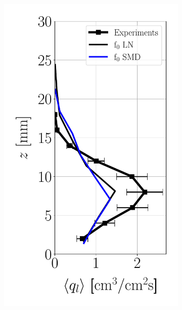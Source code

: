 \begin{figure}[h!]
\flushleft
\begin{subfigure}[b]{0.2\textwidth}
	\flushleft
   \includegraphics[scale=0.35]{./part2_developments/figures_ch6_lagrangian_JICF/params_f0/profiles/flux_along_z}
\end{subfigure}
\hspace*{0.5in}
\begin{subfigure}[b]{0.2\textwidth}
	\flushleft

\end{subfigure}
\end{figure}
